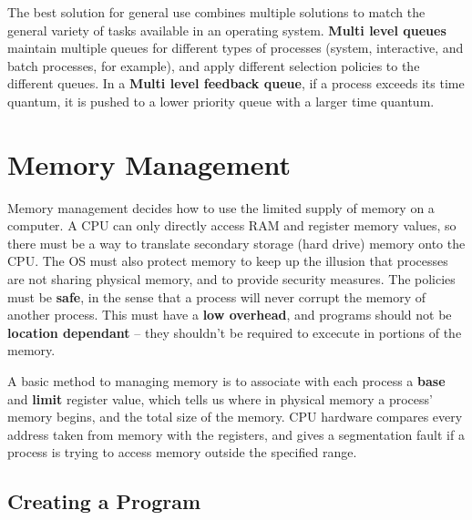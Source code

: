 The best solution for general use combines multiple solutions to match the general variety of tasks available in an operating system. {\bf Multi level queues} maintain multiple queues for different types of processes (system, interactive, and batch processes, for example), and apply different selection policies to the different queues. In a {\bf Multi level feedback queue}, if a process exceeds its time quantum, it is pushed to a lower priority queue with a larger time quantum.

\chapter{Memory Management}

Memory management decides how to use the limited supply of memory on a computer. A CPU can only directly access RAM and register memory values, so there must be a way to translate secondary storage (hard drive) memory onto the CPU. The OS must also protect memory to keep up the illusion that processes are not sharing physical memory, and to provide security measures. The policies must be {\bf safe}, in the sense that a process will never corrupt the memory of another process. This must have a {\bf low overhead}, and programs should not be {\bf location dependant} -- they shouldn't be required to excecute in portions of the memory.

A basic method to managing memory is to associate with each process a {\bf base} and {\bf limit} register value, which tells us where in physical memory a process' memory begins, and the total size of the memory. CPU hardware compares every address taken from memory with the registers, and gives a segmentation fault if a process is trying to access memory outside the specified range.

\section{Creating a Program}

